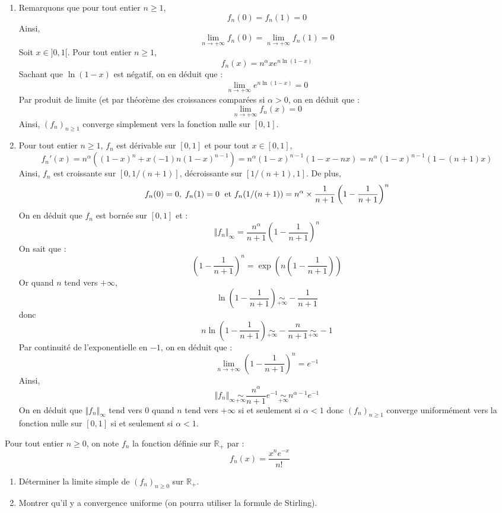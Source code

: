 \documentclass[a4paper,10pt]{report}
\begin{document}
\begin{enumerate}
\item Remarquons que pour tout entier $n \geq 1$,
$$ f_n(0)=f_n(1)=0$$
Ainsi,
$$ \lim_{n \rightarrow + \infty} f_n(0) = \lim_{n \rightarrow + \infty} f_n(1) = 0$$
Soit $x \in ]0,1[$. Pour tout entier $n \geq 1$,
$$ f_n(x) = n^{\alpha} x e^{n \ln(1-x)}$$
Sachant que $\ln(1-x)$ est négatif, on en déduit que :
$$ \lim_{n \rightarrow + \infty}e^{n \ln(1-x)} = 0$$
Par produit de limite (et par théorème des croissances comparées si $\alpha>0$, on en déduit que :
$$ \lim_{n \rightarrow + \infty} f_n(x) = 0$$
Ainsi, $(f_n)_{n \geq 1}$ converge simplement vers la fonction nulle sur $[0,1]$.
\item Pour tout entier $n \geq 1$, $f_n$ est dérivable sur $[0,1]$ et pour tout $x \in [0,1]$,
$$ f_n'(x) = n^{\alpha} ((1-x)^n + x (-1) n (1-x)^{n-1}) = n^{\alpha} (1-x)^{n-1} (1-x-nx) = n^{\alpha} (1-x)^{n-1} (1-(n+1)x)$$
Ainsi, $f_n$ est croissante sur $[0, 1/(n+1)]$, décroissante sur $[1/(n+1), 1]$. De plus,
$$ f_n(0)=0, \; f_n(1)=0 \; \hbox{ et } f_n(1/(n+1)) =n^{\alpha} \times \dfrac{1}{n+1} \left(1- \dfrac{1}{n+1}\right)^{n}$$
On en déduit que $f_n$ est bornée sur $[0,1]$ et :
$$ \Vert f_n \Vert_{\infty} =   \dfrac{n^{\alpha}}{n+1} \left(1- \dfrac{1}{n+1}\right)^{n}$$
On sait que :
$$\left(1- \dfrac{1}{n+1}\right)^{n} = \exp \left(n \left(1- \dfrac{1}{n+1}\right) \right) $$
Or quand $n$ tend vers $+ \infty$,
$$ \ln \left(1- \dfrac{1}{n+1}\right) \underset{+ \infty}{\sim} - \dfrac{1}{n+1}$$
donc 
$$ n \ln \left(1- \dfrac{1}{n+1}\right) \underset{+ \infty}{\sim} - \dfrac{n}{n+1} \underset{+ \infty}{\sim} -1$$
Par continuité de l'exponentielle en $-1$, on en déduit que :
$$ \lim_{n \rightarrow + \infty} \left(1- \dfrac{1}{n+1}\right)^{n} = e^{-1}$$
Ainsi,
$$  \Vert f_n \Vert_{\infty} \underset{+ \infty}{\sim} \dfrac{n^{\alpha}}{n+1} e^{-1} \underset{+ \infty}{\sim} n^{\alpha-1} e^{-1}$$
On en déduit que $\Vert f_n \Vert_{\infty}$ tend vers $0$ quand $n$ tend vers $+ \infty$ si et seulement si $\alpha<1$ donc $(f_n)_{n \geq 1}$ converge uniformément vers la fonction nulle sur $[0,1]$ si et seulement si $\alpha<1$.
\end{enumerate}

\begin{Exercice}{} Pour tout entier $n \geq 0$, on note $f_n$ la fonction définie sur $\mathbb{R}_+$ par :
$$ f_n(x) = \frac{x^n e^{-x}}{n!}$$

\begin{enumerate}
\item Déterminer la limite simple de $(f_n)_{n \geq 0}$ sur $\mathbb{R}_+$.
\item Montrer qu'il y a convergence uniforme (on pourra utiliser la formule de Stirling).
\end{enumerate}
\end{Exercice} 
\end{document}
